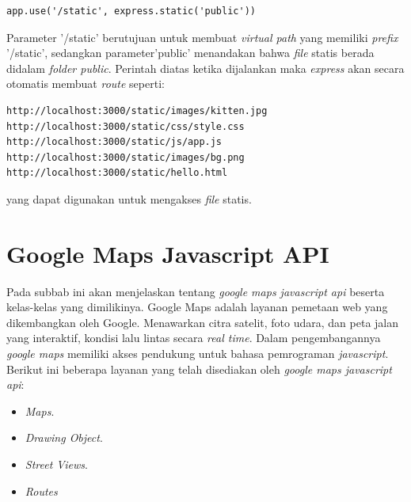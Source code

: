 \begin{lstlisting}
app.use('/static', express.static('public'))
\end{lstlisting}
Parameter '/static' berutujuan untuk membuat \textit{virtual path} yang memiliki \textit{prefix}  '/static', sedangkan parameter'public' menandakan bahwa \textit{file} statis berada didalam \textit{folder public}. Perintah diatas ketika dijalankan maka \textit{express} akan secara otomatis membuat \textit{route} seperti:
\begin{lstlisting}
http://localhost:3000/static/images/kitten.jpg
http://localhost:3000/static/css/style.css
http://localhost:3000/static/js/app.js
http://localhost:3000/static/images/bg.png
http://localhost:3000/static/hello.html
\end{lstlisting}
yang dapat digunakan untuk mengakses \textit{file} statis.

	
\section{Google Maps Javascript API}
\label{sec:googlemaps}
Pada subbab ini akan menjelaskan tentang \textit{google maps javascript api} beserta kelas-kelas yang dimilikinya. Google Maps adalah layanan pemetaan web yang dikembangkan oleh Google. Menawarkan citra satelit, foto udara, dan peta jalan yang interaktif, kondisi lalu lintas secara \textit{real time}. Dalam pengembangannya \textit{google maps} memiliki akses pendukung untuk bahasa pemrograman \textit{javascript}. Berikut ini beberapa layanan yang telah disediakan oleh \textit{google maps javascript api\cite{googlemaps:01:refrence}}:

\begin{itemize}
    \item \textit{Maps}.
    \item \textit{Drawing Object}.
    \item \textit{Street Views}.
    \item \textit{Routes}
\end{itemize}


